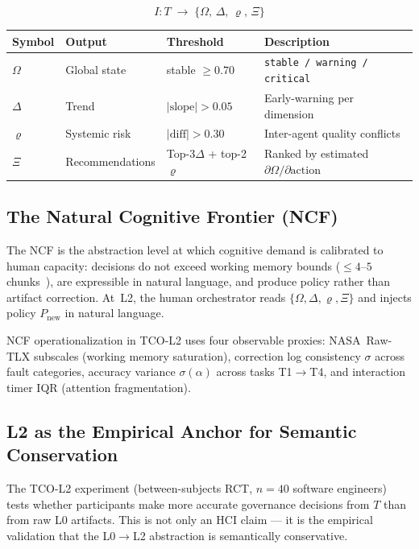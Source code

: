 \documentclass[11pt]{article}
\theoremstyle{definition}
\theoremstyle{remark}
\begin{document}
\[
  I: T \;\to\; \{\Omega,\, \Delta,\, \varrho,\, \Xi\}
\]

\begin{center}
\begin{tabular}{@{}llll@{}}
  \toprule
  Symbol & Output & Threshold & Description \\
  \midrule
  $\Omega$ & Global state & stable $\geq 0.70$ &
    \texttt{stable / warning / critical} \\
  $\Delta$ & Trend & $|\text{slope}| > 0.05$ &
    Early-warning per dimension \\
  $\varrho$ & Systemic risk & $|\text{diff}| > 0.30$ &
    Inter-agent quality conflicts \\
  $\Xi$ & Recommendations & Top-3$\Delta$ + top-2$\varrho$ &
    Ranked by estimated $\partial\Omega/\partial\text{action}$ \\
  \bottomrule
\end{tabular}
\end{center}

\subsection{The Natural Cognitive Frontier (NCF)}

The NCF is the abstraction level at which cognitive demand is
calibrated to human capacity: decisions do not exceed working memory
bounds ($\leq 4$--$5$ chunks~\cite{cowan2001}), are expressible in
natural language, and produce policy rather than artifact correction.
At~L2, the human orchestrator reads $\{\Omega, \Delta, \varrho,
\Xi\}$ and injects policy $P_\mathrm{new}$ in natural language.

NCF operationalization in TCO-L2 uses four observable proxies:
NASA~Raw-TLX subscales (working memory saturation), correction log
consistency $\sigma$ across fault categories, accuracy variance
$\sigma(\alpha)$ across tasks T1$\to$T4, and interaction timer IQR
(attention fragmentation).

\subsection{L2 as the Empirical Anchor for Semantic Conservation}

The TCO-L2 experiment (between-subjects RCT, $n{=}40$ software
engineers) tests whether participants make more accurate governance
decisions from $T$ than from raw L0 artifacts. This is not only an
HCI claim --- it is the empirical validation that the L0$\to$L2
abstraction is semantically conservative.
\end{document}
